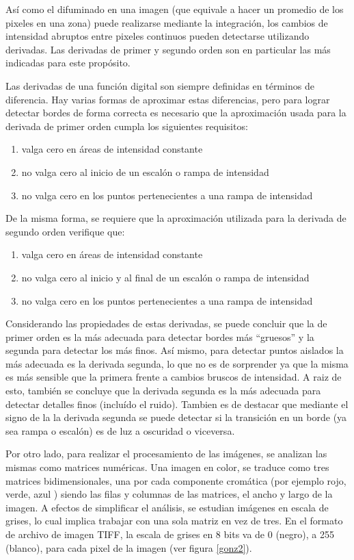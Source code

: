 Así como el difuminado en una imagen (que equivale a hacer un promedio de los pixeles en una zona) puede realizarse mediante la integración, los cambios de intensidad abruptos entre pixeles continuos pueden detectarse utilizando derivadas. Las derivadas de primer y segundo orden son en particular las más indicadas para este propósito.

Las derivadas de una función digital son siempre definidas en términos de diferencia. Hay varias formas de aproximar estas diferencias, pero para lograr detectar bordes de forma correcta es necesario que la aproximación usada para la derivada de primer orden cumpla los siguientes requisitos:

\begin{enumerate}
\item valga cero en áreas de intensidad constante
\item no valga cero al inicio de un escalón o rampa de intensidad
\item no valga cero en los puntos pertenecientes a una rampa de intensidad
\end{enumerate}

De la misma forma, se requiere que la aproximación utilizada para la derivada de segundo orden verifique que:

\begin{enumerate}
\item valga cero en áreas de intensidad constante
\item no valga cero al inicio y al final de un escalón o rampa de intensidad
\item no valga cero en los puntos pertenecientes a una rampa de intensidad
\end{enumerate}

Considerando las propiedades de estas derivadas, se puede concluir que la de primer orden es la más adecuada para detectar bordes más ``gruesos'' y la segunda para detectar los más finos. Así mismo, para detectar puntos aislados la más adecuada es la derivada segunda, lo que no es de sorprender ya que la misma es más sensible que la primera frente a cambios bruscos de intensidad. A raiz de esto, también se concluye que la derivada segunda es la más adecuada para detectar detalles finos (incluído el ruido). Tambien es de destacar que mediante el signo de la la derivada segunda se puede detectar si la transición en un borde (ya sea rampa o escalón) es de luz a oscuridad o viceversa.

Por otro lado, para realizar el procesamiento de las imágenes, se analizan las mismas como matrices numéricas. Una imagen en color, se traduce como tres matrices bidimensionales, una por cada componente cromática (por ejemplo rojo, verde, azul ) siendo las filas y columnas de las matrices, el ancho y largo de la imagen. 
A efectos de simplificar el análisis, se estudian imágenes en escala de grises, lo cual implica trabajar con una sola matriz en vez de tres. En el formato de archivo de imagen TIFF, la escala de grises en 8 bits va de 0 (negro), a 255 (blanco), para cada pixel de la imagen (ver figura \ref{gonz2}).

